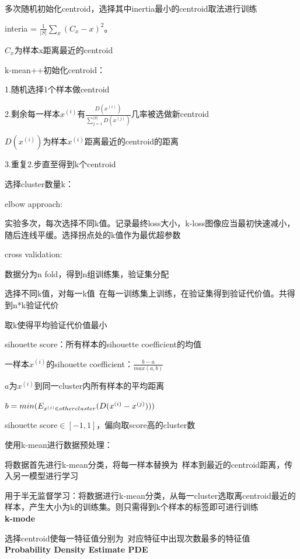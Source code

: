 \documentclass[UTF8]{ctexart}
\begin{document}
  \quad 多次随机初始化centroid，选择其中inertia最小的centroid取法进行训练

  \quad \quad interia = $\frac{1}{|S|}\sum_x (C_x - x)^2$。

  \quad \quad \quad $C_x$为样本x距离最近的centroid

  \quad k-mean++初始化centroid：

  \quad \quad 1.随机选择1个样本做centroid

  \quad \quad 2.剩余每一样本$x^{(i)}$有$\frac{D(x^{(i)})}{\sum_{j=1}^{|S|} D(x^{(j)})}$几率被选做新centroid

  \quad \quad \quad $D(x^{(i)})$为样本$x^{(i)}$距离最近的centroid的距离

  \quad \quad 3.重复2.步直至得到k个centroid

  \quad 选择cluster数量k：
  
  \quad \quad elbow approach:

  \quad \quad \quad 实验多次，每次选择不同k值。记录最终loss大小，k-loss图像应当最初快速减小，随后连线平缓。选择拐点处的k值作为最优超参数

  \quad \quad cross validation:

  \quad \quad \quad 数据分为n fold，得到n组训练集，验证集分配

  \quad \quad \quad 选择不同k值，对每一k值\ 在每一训练集上训练，在验证集得到验证代价值。共得到n*k验证代价

  \quad \quad \quad 取k使得平均验证代价值最小

  \quad \quad sihouette score：所有样本的sihouette coefficient的均值

  \quad \quad \quad 一样本$x^{(i)}$的sihouette coefficient：$\frac{b-a}{max(a, b)}$

  \quad \quad \quad \quad $a$为$x^{(i)}$到同一cluster内所有样本的平均距离
  
  \quad \quad \quad \quad $b = min(E_{x^{(j)} \in other \space cluster}(D(x^{(i)} - x^{(j)})))$

  \quad \quad \quad sihouette score$\in [-1, 1]$，偏向取score高的cluster数

  使用k-mean进行数据预处理：

  \quad 将数据首先进行k-mean分类，将每一样本替换为\ 样本到最近的centroid距离，传入另一模型进行学习

  \quad 用于半无监督学习：将数据进行k-mean分类，从每一cluster选取离centroid最近的样本，产生大小为k的训练集。则只需得到k个样本的标签即可进行训练\\
\textbf{k-mode}

  选择centroid使每一特征值分别为\ 对应特征中出现次数最多的特征值\\
\textbf{Probability Density Estimate PDE}
\end{document}
